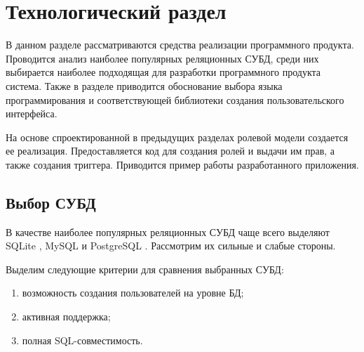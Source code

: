 \chapter{Технологический раздел}
В данном разделе рассматриваются средства реализации программного продукта. Проводится анализ наиболее популярных реляционных СУБД, среди них выбирается наиболее подходящая для разработки программного продукта система. Также в разделе приводится обоснование выбора языка программирования и соответствующей библиотеки создания пользовательского интерфейса.

На основе спроектированной в предыдущих разделах ролевой модели создается ее реализация. Предоставляется код для создания ролей и выдачи им прав, а также создания триггера. Приводится пример работы разработанного приложения.

\section{Выбор СУБД} 

В качестве наиболее популярных \cite{most_popular} реляционных СУБД чаще всего выделяют SQLite \cite{sqlite}, MySQL \cite{mysql} и PostgreSQL \cite{postgres}. Рассмотрим их сильные и слабые стороны.
%

Выделим следующие критерии для сравнения выбранных СУБД:
\begin{enumerate}
	\item возможность создания пользователей на уровне БД;
	\item активная поддержка;
	\item полная SQL-совместимость.
\end{enumerate}

